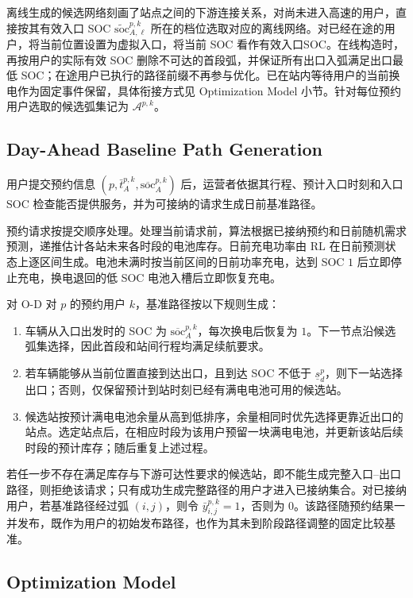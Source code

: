 \documentclass[12pt,a4paper,UTF8]{ctexart}
\begin{document}
离线生成的候选网络刻画了站点之间的下游连接关系，对尚未进入高速的用户，直接按其有效入口 SOC $\widetilde{\mathrm{soc}}_{A,\ell}^{p,k}$ 所在的档位选取对应的离线网络。对已经在途的用户，将当前位置设置为虚拟入口，将当前 SOC 看作有效入口SOC。在线构造时，再按用户的实际有效 SOC 删除不可达的首段弧，并保证所有出口入弧满足出口最低 SOC；在途用户已执行的路径前缀不再参与优化。已在站内等待用户的当前换电作为固定事件保留，具体衔接方式见 Optimization Model 小节。针对每位预约用户选取的候选弧集记为 $\mathcal A^{p,k}$。


\subsection{Day-Ahead Baseline Path Generation}

用户提交预约信息
$\left(p,\bar t_A^{p,k},\overline{\mathrm{soc}}_A^{p,k}\right)$
后，运营者依据其行程、预计入口时刻和入口 SOC 检查能否提供服务，并为可接纳的请求生成日前基准路径。

预约请求按提交顺序处理。处理当前请求前，算法根据已接纳预约和日前随机需求预测，递推估计各站未来各时段的电池库存。日前充电功率由 RL 在日前预测状态上逐区间生成。电池未满时按当前区间的日前功率充电，达到 SOC $1$ 后立即停止充电，换电退回的低 SOC 电池入槽后立即恢复充电。

对 O-D 对 $p$ 的预约用户 $k$，基准路径按以下规则生成：
\begin{enumerate}
  \item 车辆从入口出发时的 SOC 为 $\overline{\mathrm{soc}}_A^{p,k}$，每次换电后恢复为 $1$。下一节点沿候选弧集选择，因此首段和站间行程均满足续航要求。
  \item 若车辆能够从当前位置直接到达出口，且到达 SOC 不低于 $\underline s_d^p$，则下一站选择出口；否则，仅保留预计到站时刻已经有满电电池可用的候选站。
  \item 候选站按预计满电电池余量从高到低排序，余量相同时优先选择更靠近出口的站点。选定站点后，在相应时段为该用户预留一块满电电池，并更新该站后续时段的预计库存；随后重复上述过程。
\end{enumerate}

若任一步不存在满足库存与下游可达性要求的候选站，即不能生成完整入口--出口路径，则拒绝该请求；只有成功生成完整路径的用户才进入已接纳集合。对已接纳用户，若基准路径经过弧 $(i,j)$，则令 $\bar y_{i,j}^{p,k}=1$，否则为 $0$。该路径随预约结果一并发布，既作为用户的初始发布路径，也作为其未到阶段路径调整的固定比较基准。


\subsection{Optimization Model}
\end{document}
